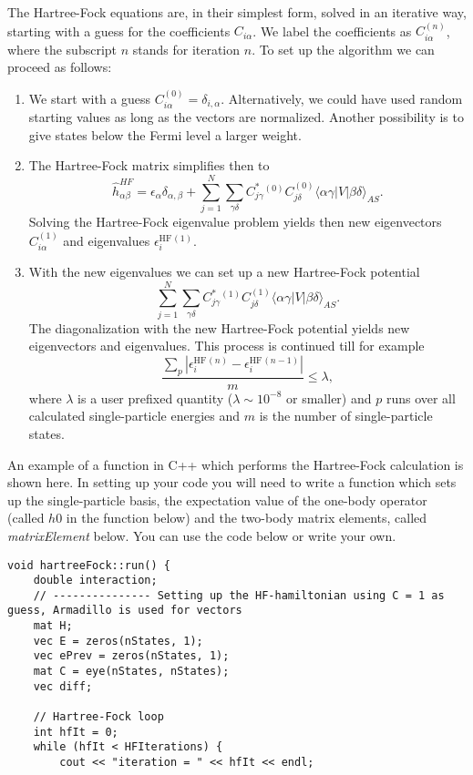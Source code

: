 \documentclass[11pt,a4wide]{article}
\begin{document}
\begin{enumerate}
The Hartree-Fock equations are, in their simplest form, solved in an iterative way, starting with a guess for the
coefficients $C_{i\alpha}$. We label the coefficients as $C_{i\alpha}^{(n)}$, where the subscript $n$ stands for iteration $n$.
To set up the algorithm we can proceed as follows:
\begin{enumerate}
\item We start with a guess $C_{i\alpha}^{(0)}=\delta_{i,\alpha}$. Alternatively, we could have used random starting values as long as the vectors are normalized. Another possibility is to give states below the Fermi level a larger weight.
\item The Hartree-Fock matrix simplifies then to
\[
\hat{h}_{\alpha\beta}^{HF}=\epsilon_{\alpha}\delta_{\alpha,\beta}+
\sum_{j=1}^N\sum_{\gamma\delta} C^*_{j\gamma}^{(0)}C_{j\delta}^{(0)}\langle \alpha\gamma|V|\beta\delta\rangle_{AS}.
\]
Solving the Hartree-Fock eigenvalue problem yields then new eigenvectors $C_{i\alpha}^{(1)}$ and eigenvalues
$\epsilon_i^{\mathrm{HF}}^{(1)}$. 
\item With the new eigenvalues we can set up a new Hartree-Fock potential 
\[
\sum_{j=1}^N\sum_{\gamma\delta} C^*_{j\gamma}^{(1)}C_{j\delta}^{(1)}\langle \alpha\gamma|V|\beta\delta\rangle_{AS}.
\]
The diagonalization with the new Hartree-Fock potential yields new eigenvectors and eigenvalues.
This process is continued till for example
\[
\frac{\sum_{p} |\epsilon_i^{\mathrm{HF}}^{(n)}-\epsilon_i^{\mathrm{HF}}^{(n-1)}|}{m}\le \lambda,  
\]
where $\lambda$ is a user prefixed quantity ($\lambda \sim 10^{-8}$ or smaller) and $p$ runs over all calculated single-particle
energies and $m$ is the number of single-particle states.
\end{enumerate}
An example of a function in C++ which performs the Hartree-Fock calculation is shown here. In setting up your code you will need to write a function which sets up the single-particle basis, the expectation value of the one-body operator (called $h0$ in the function below) and the two-body matrix elements, called {\em matrixElement} below. You can use the code below or write your own. 
\begin{lstlisting}
void hartreeFock::run() {
    double interaction;
    // --------------- Setting up the HF-hamiltonian using C = 1 as guess, Armadillo is used for vectors
    mat H;
    vec E = zeros(nStates, 1);
    vec ePrev = zeros(nStates, 1);
    mat C = eye(nStates, nStates);
    vec diff;

    // Hartree-Fock loop
    int hfIt = 0;
    while (hfIt < HFIterations) {
        cout << "iteration = " << hfIt << endl;


\end{lstlisting}
\end{enumerate}
\end{document}
